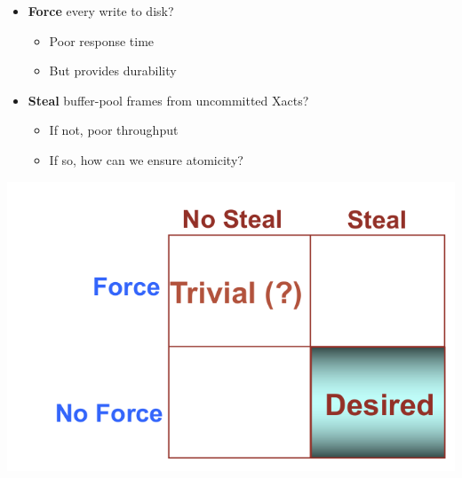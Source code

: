\begin{minipage}{0.2\textwidth}
  \begin{itemize}
  \item \textbf{Force} every write to disk?
    \begin{itemize}
    \item Poor response time
    \item But provides durability
    \end{itemize}

  \item \textbf{Steal} buffer-pool frames from uncommitted Xacts?
    \begin{itemize}
    \item If not, poor throughput
    \item If so, how can we ensure atomicity?
    \end{itemize}
  \end{itemize}
\end{minipage}%
\begin{minipage}{0.2\textwidth}
  \includegraphics[scale=0.1]{graphics/force-steal.png}
\end{minipage}


